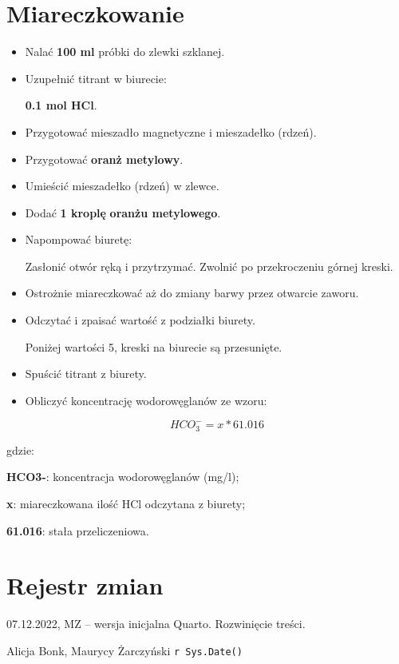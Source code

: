 \documentclass[
  letterpaper,
  DIV=11,
  numbers=noendperiod]{scrreprt}
\begin{document}
\hypertarget{miareczkowanie}{%
\section{Miareczkowanie}\label{miareczkowanie}}

\begin{itemize}
\item
  Nalać \textbf{100 ml} próbki do zlewki szklanej.
\item
  Uzupełnić titrant w biurecie:

  \textbf{0.1 mol HCl}.
\item
  Przygotować mieszadło magnetyczne i mieszadełko (rdzeń).
\item
  Przygotować \textbf{oranż metylowy}.
\item
  Umieścić mieszadełko (rdzeń) w zlewce.
\item
  Dodać \textbf{1 kroplę} \textbf{oranżu metylowego}.
\item
  Napompować biuretę:

  Zasłonić otwór ręką i przytrzymać. Zwolnić po przekroczeniu górnej
  kreski.
\item
  Ostrożnie miareczkować aż do zmiany barwy przez otwarcie zaworu.
\item
  Odczytać i zpaisać wartość z podziałki biurety.

  Poniżej wartości 5, kreski na biurecie są przesunięte.
\item
  Spuścić titrant z biurety.
\item
  Obliczyć koncentrację wodorowęglanów ze wzoru:

  \[
  HCO_3^- = x * 61.016
  \]
\end{itemize}

gdzie:

\textbf{HCO3-}: koncentracja wodorowęglanów (mg/l);

\textbf{x}: miareczkowana ilość HCl odczytana z biurety;

\textbf{61.016}: stała przeliczeniowa.

\hypertarget{pagebreak-rejestr-zmian-4}{%
\section{\texorpdfstring{\newpage{}Rejestr
zmian}{Rejestr zmian}}\label{pagebreak-rejestr-zmian-4}}

07.12.2022, MZ -- wersja inicjalna Quarto. Rozwinięcie treści.

Alicja Bonk, Maurycy Żarczyński \texttt{r\ Sys.Date()}
\end{document}
